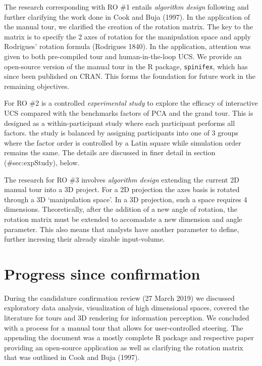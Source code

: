 \documentclass[11,]{article}
\begin{document}
The research corresponding with RO \#1 entails \emph{algorithm design} following and further clarifying the work done in Cook and Buja (1997). In the application of the manual tour, we clarified the creation of the rotation matrix. The key to the matrix is to specify the 2 axes of rotation for the manipulation space and apply Rodrigues' rotation formula (Rodrigues 1840). In the application, attention was given to both pre-compiled tour and human-in-the-loop UCS. We provide an open-source version of the manual tour in the R package, \texttt{spinifex}, which has since been published on CRAN. This forms the foundation for future work in the remaining objectives.

For RO \#2 is a controlled \emph{experimental study} to explore the efficacy of interactive UCS compared with the benchmarks factors of PCA and the grand tour. This is designed as a within-participant study where each participant performs all factors. the study is balanced by assigning participants into one of 3 groups where the factor order is controlled by a Latin square while simulation order remains the same. The details are discussed in finer detail in section (\#sec:expStudy), below.

The research for RO \#3 involves \emph{algorithm design} extending the current 2D manual tour into a 3D project. For a 2D projection the axes basis is rotated through a 3D `manipulation space'. In a 3D projection, such a space requires 4 dimensions. Theoretically, after the addition of a new angle of rotation, the rotation matrix must be extended to accomadate a new dimension and angle parameter. This also means that analysts have another parameter to define, further incresing their already sizable input-volume.

\hypertarget{progress-since-confirmation}{%
\section{Progress since confirmation}\label{progress-since-confirmation}}

During the candidature confirmation review (27 March 2019) we discussed exploratory data analysis, visualization of high dimensional spaces, covered the literature for tours and 3D rendering for information perception. We concluded with a process for a manual tour that allows for user-controlled steering. The appending the document was a mostly complete R package and respective paper providing an open-source application as well as clarifying the rotation matrix that was outlined in Cook and Buja (1997).
\end{document}
